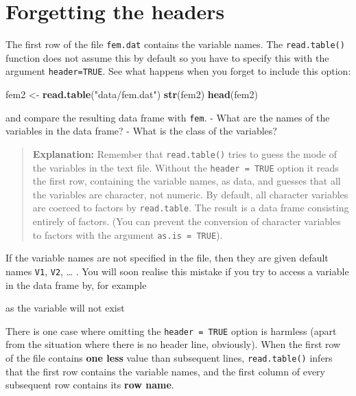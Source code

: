 \documentclass[
]{book}
\newenvironment{Shaded}{\begin{snugshade}}{\end{snugshade}}
\newcommand{\FunctionTok}[1]{\textcolor[rgb]{0.13,0.29,0.53}{\textbf{#1}}}
\newcommand{\NormalTok}[1]{#1}
\newcommand{\OtherTok}[1]{\textcolor[rgb]{0.56,0.35,0.01}{#1}}
\newcommand{\SpecialCharTok}[1]{\textcolor[rgb]{0.81,0.36,0.00}{\textbf{#1}}}
\newcommand{\StringTok}[1]{\textcolor[rgb]{0.31,0.60,0.02}{#1}}
\begin{document}
\section{Forgetting the headers}\label{forgetting-the-headers}

The first row of the file \texttt{fem.dat} contains the variable names.
The \texttt{read.table()} function does not assume this by default so
you have to specify this with the argument \texttt{header=TRUE}. See
what happens when you forget to include this option:

\begin{Shaded}
\begin{Highlighting}[]
\NormalTok{fem2 }\OtherTok{\textless{}{-}} \FunctionTok{read.table}\NormalTok{(}\StringTok{"data/fem.dat"}\NormalTok{)}
\FunctionTok{str}\NormalTok{(fem2)}
\FunctionTok{head}\NormalTok{(fem2)}
\end{Highlighting}
\end{Shaded}

and compare the resulting data frame with \texttt{fem}.
- What are the names of the variables in the data frame?
- What is the class of the variables?

\begin{quote}
\textbf{Explanation:} Remember that \texttt{read.table()} tries to guess
the mode of the variables in the text file. Without the
\texttt{header\ =\ TRUE} option it reads the first row, containing the
variable names, as data, and guesses that all the variables are
character, not numeric. By default, all character variables are
coerced to factors by \texttt{read.table}. The result is a data frame
consisting entirely of factors. (You can prevent the conversion of
character variables to factors with the argument \texttt{as.is\ =\ TRUE}).
\end{quote}

If the variable names are not specified in the file, then they are
given default names \texttt{V1}, \texttt{V2}, \ldots{} . You will soon realise this
mistake if you try to access a variable in the data frame by, for
example

\begin{Shaded}
\end{Shaded}

as the variable will not exist

There is one case where omitting the \texttt{header\ =\ TRUE} option is
harmless (apart from the situation where there is no header line,
obviously). When the first row of the file contains \textbf{one less}
value than subsequent lines, \texttt{read.table()} infers that the first
row contains the variable names, and the first column of every
subsequent row contains its \textbf{row name}.
\end{document}
